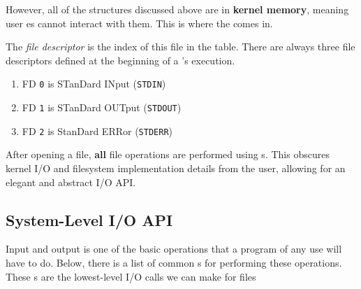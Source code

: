 However, all of the structures discussed above are in \textbf{kernel memory}, meaning user es cannot interact with them.
This is where the  comes in.

\begin{definition}\label{def:File_Descriptor}
  The \emph{file descriptor} is the index of this file in the  table.
  There are always three file descriptors defined at the beginning of a 's execution.
  \begin{enumerate}[noitemsep]
  \item FD \texttt{0} is STanDard INput (\texttt{STDIN})
  \item FD \texttt{1} is STanDard OUTput (\texttt{STDOUT})
  \item FD \texttt{2} is StanDard ERRor (\texttt{STDERR})
  \end{enumerate}
\end{definition}

After opening a file, \textbf{all} file operations are performed using s.
This obscures kernel I/O and filesystem implementation details from the user, allowing for an elegant and abstract I/O API.\@

\subsection{System-Level I/O API}\label{subsec:System_Level_IO_API}
Input and output is one of the basic operations that a program of any use will have to do.
Below, there is a list of common s for performing these operations.
These s are the lowest-level I/O calls we can make for files

